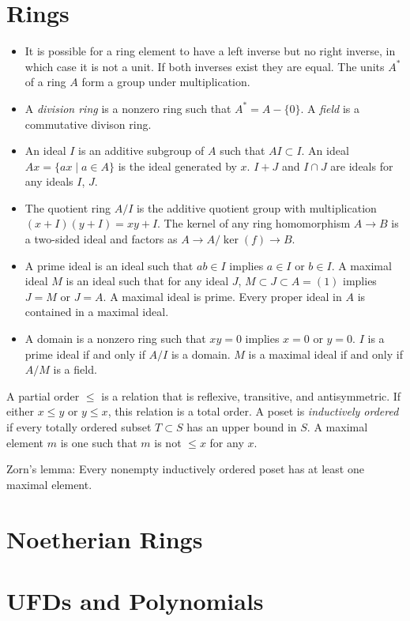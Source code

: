 \documentclass{article}
\begin{document}
\section{Rings}
\begin{itemize}
  \item{
    It is possible for a ring element to have a left inverse but no
    right inverse, in which case it is not a unit. If both inverses
    exist they are equal. The units $A^\ast$ of a ring $A$ form a
    group under multiplication.
  }
  \item{
    A \emph{division ring} is a nonzero ring such that $A^\ast = A -
    \{ 0 \}$. A \emph{field} is a commutative divison ring.
  }
  \item{
    An ideal $I$ is an additive subgroup of $A$ such that
    $AI \subset I$. An ideal $Ax = \{ax \mid a \in A\}$ is the ideal
    generated by $x$. $I + J$ and $I \cap J$ are ideals for any ideals
    $I$, $J$.
  }
  \item{
    The quotient ring $A / I$ is the additive quotient group with
    multiplication $(x + I)(y + I) = xy + I$. The kernel of any ring
    homomorphism $A \to B$ is a two-sided ideal and factors as
    $A \to A / \ker(f) \to B$.
  }
  \item{
    A prime ideal is an ideal such that $ab \in I$ implies $a \in I$
    or $b \in I$. A maximal ideal $M$ is an ideal such that for any
    ideal $J$, $M \subset J \subset A = (1)$ implies $J = M$ or
    $J = A$. A maximal ideal is prime. Every proper ideal in $A$ is
    contained in a maximal ideal.
  }
  \item{
    A domain is a nonzero ring such that $xy = 0$ implies $x = 0$ or
    $y = 0$. $I$ is a prime ideal if and only if $A / I$ is a
    domain. $M$ is a maximal ideal if and only if $A / M$ is a field.
  }
\end{itemize}

A partial order $\leq$ is a relation that is reflexive, transitive, and
antisymmetric. If either $x \leq y$ or $y \leq x$, this relation is a
total order. A poset is \emph{inductively ordered} if every totally
ordered subset $T \subset S$ has an upper bound in $S$. A maximal
element $m$ is one such that $m$ is not $\leq x$ for any $x$.

Zorn's lemma: Every nonempty inductively ordered poset has at least
one maximal element.


\section{Noetherian Rings}

\section{UFDs and Polynomials}
\end{document}
